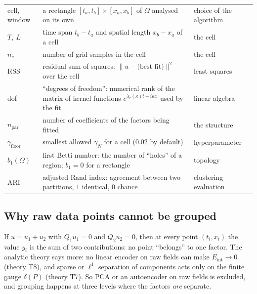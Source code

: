 \documentclass[11pt,a4paper]{article}
\theoremstyle{definition}
\newcommand{\Eint}{E_{\mathrm{int}}}
\newcommand{\thy}[1]{\textcolor{cG}{\textsf{\footnotesize(theory #1)}}}
\begin{document}
\begin{symbols}
\begin{tabular}{@{}L{2.6cm}L{6.0cm}L{4.3cm}@{}}
cell, window & a rectangle $[t_a,t_b]\times[x_a,x_b]$ of $\Omega$ analysed on its own & choice of the algorithm\\
$T,\ L$ & time span $t_b-t_a$ and spatial length $x_b-x_a$ of a cell & the cell\\
$n_c$ & number of grid samples in the cell & the cell\\
RSS & residual sum of squares: $\|u-\text{(best fit)}\|^2$ over the cell & least squares\\
dof & ``degrees of freedom'': numerical rank of the matrix of kernel functions $e^{\lambda_r(\kappa)t+i\kappa x}$ used by the fit & linear algebra\\
$n_{\mathrm{par}}$ & number of coefficients of the factors being fitted & the structure\\
$\gamma_{\mathrm{floor}}$ & smallest allowed $\gamma_N$ for a cell ($0.02$ by default) & hyperparameter\\
$b_1(\Omega)$ & first Betti number: the number of ``holes'' of a region; $b_1=0$ for a rectangle & topology\\
ARI & adjusted Rand index: agreement between two partitions, $1$ identical, $0$ chance & clustering evaluation\\
\end{tabular}
\end{symbols}

\subsection{Why raw data points cannot be grouped}
If $u=u_1+u_2$ with $Q_1u_1=0$ and $Q_2u_2=0$, then at every point $(t_i,x_i)$ the value $y_i$ is the sum of two contributions: no point ``belongs'' to one factor. The analytic theory says more: no linear encoder on raw fields can make $\Eint\to0$ \thy{T8}, and sparse or $\ell^1$ separation of components acts only on the finite gauge $\delta(P)$ \thy{T7}. So PCA or an autoencoder on raw fields is excluded, and grouping happens at three levels where the factors \emph{are} separate.
\end{document}
